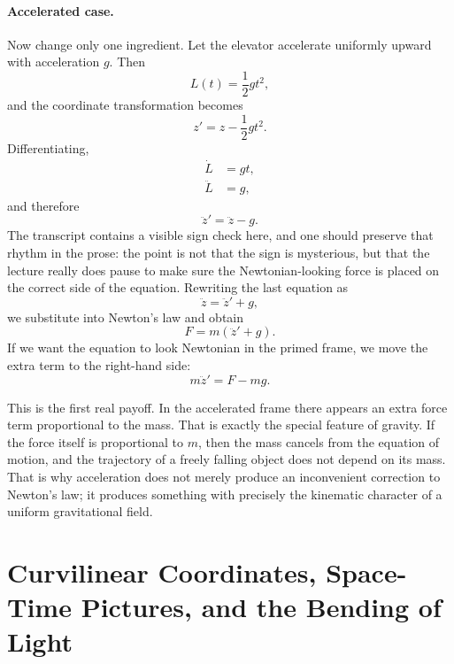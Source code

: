 \paragraph{Accelerated case.}
Now change only one ingredient.  Let the elevator accelerate uniformly upward with acceleration \(g\).  Then
\begin{equation}
L(t)=\frac{1}{2}gt^2,
\end{equation}
and the coordinate transformation becomes
\begin{equation}
z' = z - \frac{1}{2}gt^2.
\end{equation}
Differentiating,
\begin{align}
\dot L &= gt,\\
\ddot L &= g,
\end{align}
and therefore
\begin{equation}
\ddot z' = \ddot z - g.
\end{equation}
The transcript contains a visible sign check here, and one should preserve that rhythm in the prose: the point is not that the sign is mysterious, but that the lecture really does pause to make sure the Newtonian-looking force is placed on the correct side of the equation.  Rewriting the last equation as
\begin{equation}
\ddot z = \ddot z' + g,
\end{equation}
we substitute into Newton's law and obtain
\begin{equation}
F = m(\ddot z' + g).
\end{equation}
If we want the equation to look Newtonian in the primed frame, we move the extra term to the right-hand side:
\begin{equation}
m\ddot z' = F - mg.
\end{equation}

This is the first real payoff.  In the accelerated frame there appears an extra force term proportional to the mass.  That is exactly the special feature of gravity.  If the force itself is proportional to \(m\), then the mass cancels from the equation of motion, and the trajectory of a freely falling object does not depend on its mass.  That is why acceleration does not merely produce an inconvenient correction to Newton's law; it produces something with precisely the kinematic character of a uniform gravitational field.

\section{Curvilinear Coordinates, Space-Time Pictures, and the Bending of Light}

